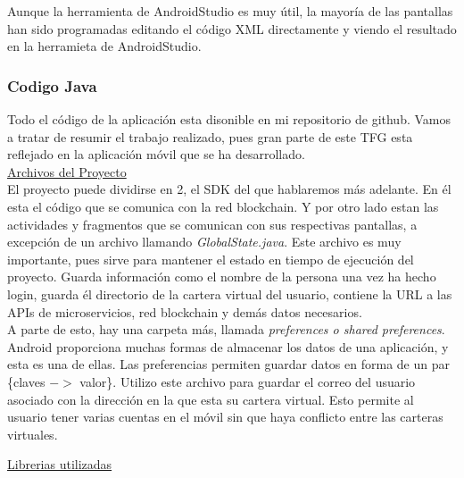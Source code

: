 Aunque la herramienta de AndroidStudio es muy útil, la mayoría de las pantallas han sido programadas editando el código XML directamente y viendo el resultado en la herramieta de AndroidStudio.

\subsubsection{Codigo Java}

Todo el código de la aplicación esta disonible en mi repositorio de github\cite{forgis98}. Vamos a tratar de resumir el trabajo realizado, pues gran parte de este TFG esta reflejado en la aplicación móvil que se ha desarrollado. \\

\uline{Archivos del Proyecto} \\

El proyecto puede dividirse en 2, el SDK del que hablaremos más adelante. En él esta el código que se comunica con la red blockchain. Y por otro lado estan las actividades y fragmentos que se comunican con sus respectivas pantallas, a excepción de un archivo llamando \emph{GlobalState.java}. Este archivo es muy importante, pues sirve para mantener el estado en tiempo de ejecución del proyecto. Guarda información como el nombre de la persona una vez ha hecho login, guarda él directorio de la cartera virtual del usuario, contiene la URL a las APIs de microservicios, red blockchain y demás datos necesarios. \\

A parte de esto, hay una carpeta más, llamada \emph{preferences o shared preferences}. Android proporciona muchas formas de almacenar los datos de una aplicación, y esta es una de ellas. Las preferencias permiten guardar datos en forma de un par \{claves $->$ valor\}. Utilizo este archivo para guardar el correo del usuario asociado con la dirección en la que esta su cartera virtual. Esto permite al usuario tener varias cuentas en el móvil sin que haya conflicto entre las carteras virtuales. 

\uline{Librerias utilizadas} \\

